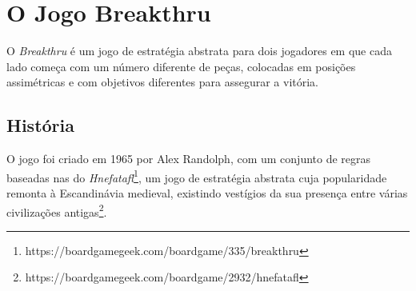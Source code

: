 \documentclass[a4paper]{article}
\begin{document}

\newpage

%
%
%
%
%
%
%


\section{O Jogo Breakthru}
O \emph{Breakthru} é um jogo de estratégia abstrata para dois jogadores em que cada lado começa com um número diferente de peças, colocadas em posições assimétricas e com objetivos diferentes para assegurar a vitória.

\subsection{História}
O jogo foi criado em 1965 por Alex Randolph, com um conjunto de regras baseadas nas do \emph{Hnefatafl}\footnote{https://boardgamegeek.com/boardgame/335/breakthru}, um jogo de estratégia abstrata cuja popularidade remonta à Escandinávia medieval, existindo vestígios da sua presença entre várias civilizações antigas\footnote{https://boardgamegeek.com/boardgame/2932/hnefatafl}.
\
\end{document}
